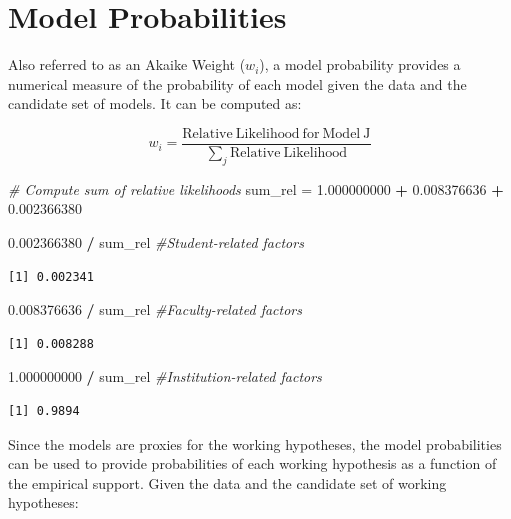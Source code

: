 \documentclass[]{book}
\newenvironment{Shaded}{\begin{snugshade}}{\end{snugshade}}
\newcommand{\CommentTok}[1]{\textcolor[rgb]{0.56,0.35,0.01}{\textit{#1}}}
\newcommand{\FloatTok}[1]{\textcolor[rgb]{0.00,0.00,0.81}{#1}}
\newcommand{\NormalTok}[1]{#1}
\newcommand{\OperatorTok}[1]{\textcolor[rgb]{0.81,0.36,0.00}{\textbf{#1}}}
\newcommand{\StringTok}[1]{\textcolor[rgb]{0.31,0.60,0.02}{#1}}
\begin{document}
\hypertarget{model-probabilities}{%
\section{Model Probabilities}\label{model-probabilities}}

Also referred to as an Akaike Weight (\(w_i\)), a model probability provides a numerical measure of the probability of each model given the data and the candidate set of models. It can be computed as:

\[
w_i = \frac{\mathrm{Relative~Likelihood~for~Model~J}}{\sum_j \mathrm{Relative~Likelihood}}
\]

\begin{Shaded}
\begin{Highlighting}[]
\CommentTok{# Compute sum of relative likelihoods}
\NormalTok{sum_rel =}\StringTok{ }\FloatTok{1.000000000} \OperatorTok{+}\StringTok{ }\FloatTok{0.008376636} \OperatorTok{+}\StringTok{ }\FloatTok{0.002366380}

\FloatTok{0.002366380} \OperatorTok{/}\StringTok{ }\NormalTok{sum_rel }\CommentTok{#Student-related factors}
\end{Highlighting}
\end{Shaded}

\begin{verbatim}
[1] 0.002341
\end{verbatim}

\begin{Shaded}
\begin{Highlighting}[]
\FloatTok{0.008376636} \OperatorTok{/}\StringTok{ }\NormalTok{sum_rel }\CommentTok{#Faculty-related factors}
\end{Highlighting}
\end{Shaded}

\begin{verbatim}
[1] 0.008288
\end{verbatim}

\begin{Shaded}
\begin{Highlighting}[]
\FloatTok{1.000000000} \OperatorTok{/}\StringTok{ }\NormalTok{sum_rel }\CommentTok{#Institution-related factors}
\end{Highlighting}
\end{Shaded}

\begin{verbatim}
[1] 0.9894
\end{verbatim}

Since the models are proxies for the working hypotheses, the model probabilities can be used to provide probabilities of each working hypothesis as a function of the empirical support. Given the data and the candidate set of working hypotheses:
\end{document}
